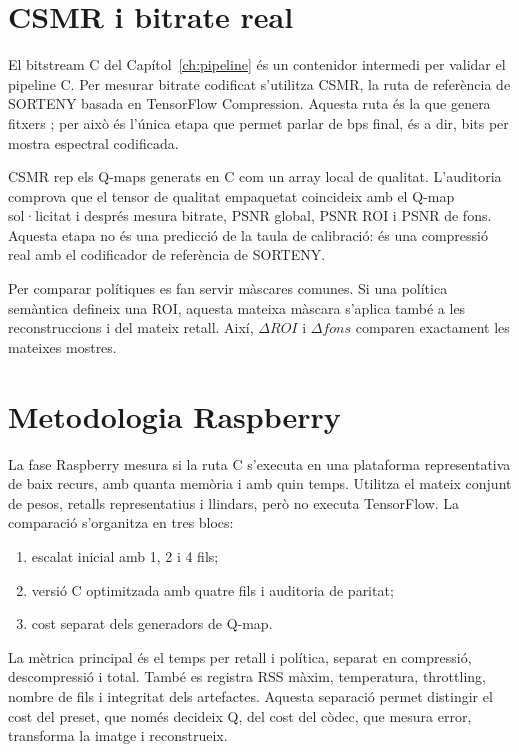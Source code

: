 \section{CSMR i bitrate real}\label{sec:csmr_method}

El bitstream C del Capítol~\ref{ch:pipeline} és un contenidor intermedi per
validar el pipeline C. Per mesurar bitrate codificat s'utilitza CSMR, la ruta de
referència de SORTENY basada en TensorFlow Compression. Aquesta ruta és la que
genera fitxers ; per això és l'única etapa que permet parlar de bps
final, és a dir, bits per mostra espectral codificada.

CSMR rep els Q-maps generats en C com un array local de qualitat. L'auditoria
comprova que el tensor de qualitat empaquetat coincideix amb el Q-map sol·licitat
i després mesura bitrate, PSNR global, PSNR ROI i PSNR de fons. Aquesta etapa no
és una predicció de la taula de calibració: és una compressió real amb el
codificador de referència de SORTENY.

Per comparar polítiques es fan servir màscares comunes. Si una política
semàntica defineix una ROI, aquesta mateixa màscara s'aplica també a les
reconstruccions  i  del mateix retall. Així,
$\Delta ROI$ i $\Delta fons$ comparen exactament les mateixes mostres.

\section{Metodologia Raspberry}\label{sec:rpi_method}

La fase Raspberry mesura si la ruta C s'executa en una plataforma representativa
de baix recurs, amb quanta memòria i amb quin temps. Utilitza el mateix conjunt
de pesos, retalls representatius i llindars, però no executa TensorFlow. La
comparació s'organitza en tres blocs:

\begin{enumerate}[leftmargin=*]
  \item escalat inicial amb 1, 2 i 4 fils;
  \item versió C optimitzada amb quatre fils i auditoria de paritat;
  \item cost separat dels generadors de Q-map.
\end{enumerate}

La mètrica principal és el temps per retall i política, separat en compressió,
descompressió i total. També es registra RSS màxim, temperatura, throttling,
nombre de fils i integritat dels artefactes. Aquesta separació permet distingir
el cost del preset, que només decideix Q, del cost del còdec, que mesura error,
transforma la imatge i reconstrueix.
